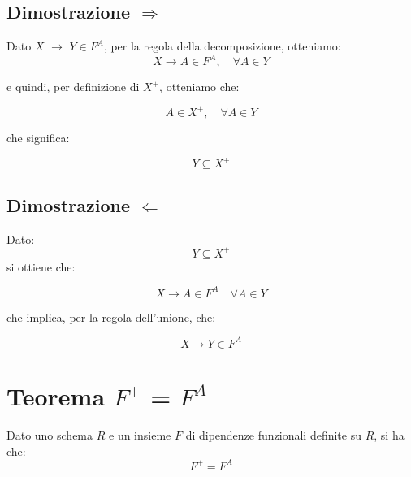\documentclass{article}
\begin{document}
\subsection{Dimostrazione $\Rightarrow$}

Dato $X$ $\rightarrow$ $Y \in F^{A}$, per la regola della decomposizione, otteniamo:
\[X \rightarrow A \in F^{A}, \quad \forall A \in Y\]

e quindi, per definizione di $X^{+}$, otteniamo che: 

\[A \in X^{+}, \quad \forall A \in Y  \]

che significa: 

\[Y \subseteq X^{+}\]



\subsection{Dimostrazione $\Leftarrow$}
Dato: 
\[Y \subseteq X^{+}\]
si ottiene che: 

\[X \rightarrow A \in F^{A} \quad \forall A \in Y\]

che implica, per la regola dell'unione, che: 

\[X \rightarrow Y \in F^{A}\]


\pagebreak
\section{Teorema $F^{+}$ = $F^{A}$}

Dato uno schema $R$ e un insieme $F$ di dipendenze funzionali definite su $R$, si ha che:
\[ F^{+} = F^{A}\]
\end{document}
